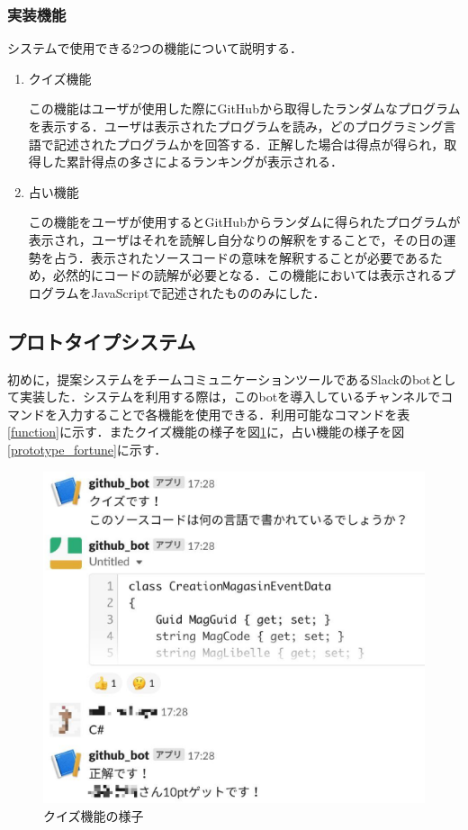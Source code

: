 \subsubsection{実装機能}
システムで使用できる2つの機能について説明する．
\begin{enumerate}
  \item クイズ機能

  この機能はユーザが使用した際にGitHubから取得したランダムなプログラムを表示する．ユーザは表示されたプログラムを読み，どのプログラミング言語で記述されたプログラムかを回答する．正解した場合は得点が得られ，取得した累計得点の多さによるランキングが表示される．

  \item 占い機能

  この機能をユーザが使用するとGitHubからランダムに得られたプログラムが表示され，ユーザはそれを読解し自分なりの解釈をすることで，その日の運勢を占う．表示されたソースコードの意味を解釈することが必要であるため，必然的にコードの読解が必要となる．この機能においては表示されるプログラムをJavaScriptで記述されたもののみにした．

\end{enumerate}
\subsection{プロトタイプシステム}
初めに，提案システムをチームコミュニケーションツールであるSlackのbotとして実装した．システムを利用する際は，このbotを導入しているチャンネルでコマンドを入力することで各機能を使用できる．利用可能なコマンドを表\ref{function}に示す．またクイズ機能の様子を図\ref{prototype_quiz}に，占い機能の様子を図\ref{prototype_fortune}に示す．

\begin{figure}[!h]
  \begin{center}
    \includegraphics[width=0.6\linewidth]{image/prototype_quiz.eps}
  \end{center}
  \caption{クイズ機能の様子}
  \label{prototype_quiz}
\end{figure}

